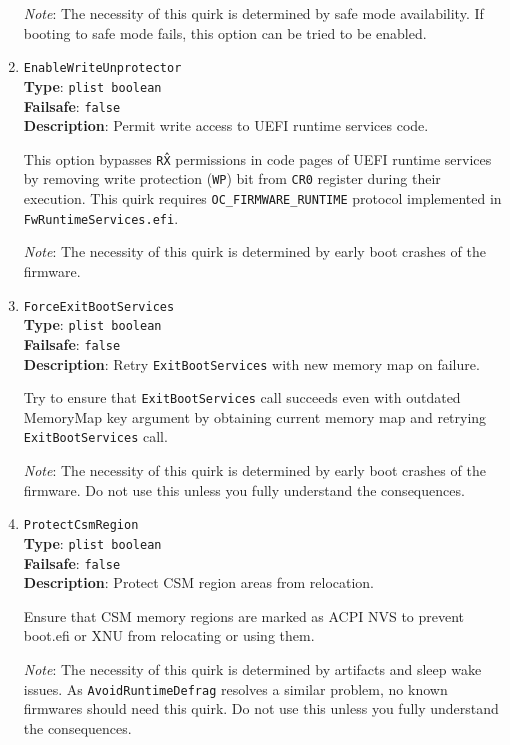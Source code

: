 \documentclass[]{article}
\begin{document}
\begin{enumerate}
  \emph{Note}: The necessity of this quirk is determined by safe mode availability. If
  booting to safe mode fails, this option can be tried to be enabled.

\item
  \texttt{EnableWriteUnprotector}\\
  \textbf{Type}: \texttt{plist\ boolean}\\
  \textbf{Failsafe}: \texttt{false}\\
  \textbf{Description}: Permit write access to UEFI runtime services code.

  This option bypasses \texttt{R\^X} permissions in code pages of UEFI runtime
  services by removing write protection (\texttt{WP}) bit from \texttt{CR0}
  register during their execution. This quirk requires \texttt{OC\_FIRMWARE\_RUNTIME}
  protocol implemented in \texttt{FwRuntimeServices.efi}.

  \emph{Note}: The necessity of this quirk is determined by early boot crashes
  of the firmware.

\item
  \texttt{ForceExitBootServices}\\
  \textbf{Type}: \texttt{plist\ boolean}\\
  \textbf{Failsafe}: \texttt{false}\\
  \textbf{Description}: Retry \texttt{ExitBootServices} with new memory map on failure.

  Try to ensure that \texttt{ExitBootServices} call succeeds even with outdated MemoryMap
  key argument by obtaining current memory map and retrying \texttt{ExitBootServices} call.

  \emph{Note}: The necessity of this quirk is determined by early boot crashes
  of the firmware. Do not use this unless you fully understand the consequences.

\item
  \texttt{ProtectCsmRegion}\\
  \textbf{Type}: \texttt{plist\ boolean}\\
  \textbf{Failsafe}: \texttt{false}\\
  \textbf{Description}: Protect CSM region areas from relocation.

  Ensure that CSM memory regions are marked as ACPI NVS to prevent boot.efi or XNU from
  relocating or using them.

  \emph{Note}: The necessity of this quirk is determined by artifacts and sleep wake issues.
  As \texttt{AvoidRuntimeDefrag} resolves a similar problem, no known firmwares should need
  this quirk. Do not use this unless you fully understand the consequences.


\end{enumerate}
\end{document}

